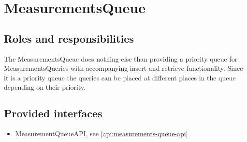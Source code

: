 \section{MeasurementsQueue}
\label{element:measurements-queue}

\subsection{Roles and responsibilities}

\npar The MeasurementsQueue does nothing else than providing a priority queue
for MeasurementsQueries with accompanying insert and retrieve functionality.
Since it is a priority queue the queries can be placed at different places in
the queue depending on their priority. 

\subsection{Provided interfaces}

\begin{itemize}
  \item MeasurementQueueAPI, see \ref{api:measurements-queue-api}
\end{itemize}